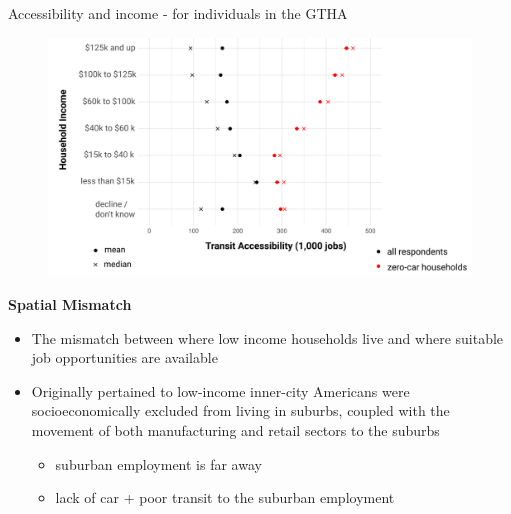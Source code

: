 \documentclass[aspectratio=169]{beamer}
\begin{document}
\begin{frame}
	
	Accessibility and income - for individuals in the GTHA
	
	\begin{figure}
		\centering
		\includegraphics[width=0.94\linewidth]{images/income_transit_gtha.png}
	\end{figure}
	
\end{frame}



\begin{frame}
	
	\textbf{Spatial Mismatch}
	
	\begin{itemize}
		\item The mismatch between where low income households live and
		where suitable job opportunities are available
		
		\item Originally pertained to low-income inner-city Americans
		were socioeconomically excluded from living in suburbs,
		coupled with the movement of both manufacturing and retail
		sectors to the suburbs
		
		
		\begin{itemize}
			\item suburban employment is far away
			\item lack of car + poor transit to the suburban employment
		\end{itemize}
	\end{itemize}
	
\end{frame}
\end{document}

